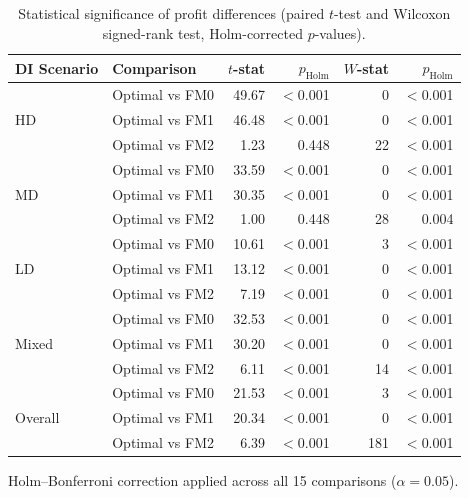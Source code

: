 \begin{table}[H]
\centering
\caption{Statistical significance of profit differences (paired $t$-test and Wilcoxon signed-rank test, Holm-corrected $p$-values).}
\label{tab:stat_tests}
\begin{threeparttable}
\small
\renewcommand{\arraystretch}{1.3}
\begin{tabular}{ll rr rr}
\toprule
{DI Scenario} & {Comparison} & {$t$-stat} & {$p_{\text{Holm}}$} & {$W$-stat} & {$p_{\text{Holm}}$} \\
\midrule
\multirow{3}{*}{HD} & Optimal vs FM0 & 49.67 & $<$0.001 & \num{0} & $<$0.001 \\
 & Optimal vs FM1 & 46.48 & $<$0.001 & \num{0} & $<$0.001 \\
 & Optimal vs FM2 & 1.23 & 0.448 & \num{22} & $<$0.001 \\
\midrule
\multirow{3}{*}{MD} & Optimal vs FM0 & 33.59 & $<$0.001 & \num{0} & $<$0.001 \\
 & Optimal vs FM1 & 30.35 & $<$0.001 & \num{0} & $<$0.001 \\
 & Optimal vs FM2 & 1.00 & 0.448 & \num{28} & 0.004 \\
\midrule
\multirow{3}{*}{LD} & Optimal vs FM0 & 10.61 & $<$0.001 & \num{3} & $<$0.001 \\
 & Optimal vs FM1 & 13.12 & $<$0.001 & \num{0} & $<$0.001 \\
 & Optimal vs FM2 & 7.19 & $<$0.001 & \num{0} & $<$0.001 \\
\midrule
\multirow{3}{*}{Mixed} & Optimal vs FM0 & 32.53 & $<$0.001 & \num{0} & $<$0.001 \\
 & Optimal vs FM1 & 30.20 & $<$0.001 & \num{0} & $<$0.001 \\
 & Optimal vs FM2 & 6.11 & $<$0.001 & \num{14} & $<$0.001 \\
\midrule
\multirow{3}{*}{Overall} & Optimal vs FM0 & 21.53 & $<$0.001 & \num{3} & $<$0.001 \\
 & Optimal vs FM1 & 20.34 & $<$0.001 & \num{0} & $<$0.001 \\
 & Optimal vs FM2 & 6.39 & $<$0.001 & \num{181} & $<$0.001 \\
\bottomrule
\end{tabular}
\begin{tablenotes}
\footnotesize
\item Holm--Bonferroni correction applied across all 15 comparisons ($\alpha=0.05$).
\end{tablenotes}
\end{threeparttable}
\end{table}